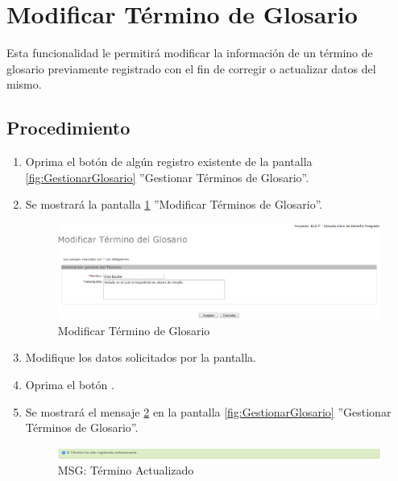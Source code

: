 \hypertarget{cv:modificarTermino}{\section{Modificar Término de Glosario}} \label{sec:modificarTermino}

	Esta funcionalidad le permitirá modificar la información de un término de glosario previamente registrado con el fin de corregir o actualizar datos del mismo. 

		\subsection{Procedimiento}

			\begin{enumerate}
	
			\item Oprima el botón \IUEditar{} de algún registro existente de la pantalla \ref{fig:GestionarGlosario} ''Gestionar Términos de Glosario''.
	
			\item Se mostrará la pantalla \ref{fig:modificarTermino} ''Modificar Términos de Glosario''.
			
			\begin{figure}[htbp!]
				\begin{center}
					\includegraphics[scale=0.5]{roles/lider/glosario/pantallas/IU6-2modificarTermino}
					\caption{Modificar Término de Glosario}
					\label{fig:modificarTermino}
				\end{center}
			\end{figure}
		
			\item Modifique los datos solicitados por la pantalla.
						
			\item Oprima el botón \IUAceptar.
			
			\item Se mostrará el mensaje \ref{fig:terminoModificado} en la pantalla \ref{fig:GestionarGlosario} ''Gestionar Términos de Glosario''.
			
			\begin{figure}[htbp!]
				\begin{center}
					\includegraphics[scale=0.5]{roles/lider/glosario/pantallas/IU6-2MSG1}
					\caption{MSG: Término Actualizado}
					\label{fig:terminoModificado}
				\end{center}
			\end{figure}
			\end{enumerate}